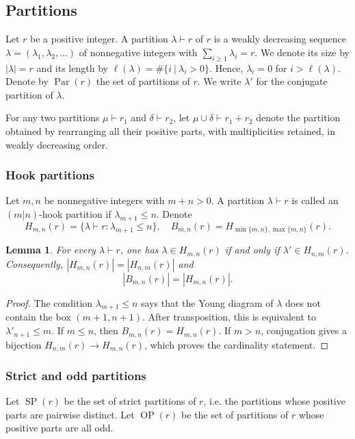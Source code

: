 \documentclass[11pt]{amsart}
\numberwithin{equation}{section}
\theoremstyle{plain}
\newtheorem{lem}[thm]{Lemma}
\theoremstyle{definition}
\theoremstyle{remark}
\begin{document}
\subsection{Partitions}
Let $r$ be a positive integer. A partition $\lambda\vdash r$ of $r$ is a weakly decreasing sequence
$\lambda=(\lambda_1,\lambda_2,\ldots)$ of nonnegative integers with
$\sum_{i\geq1}\lambda_i=r$.
We denote its size by $|\lambda|=r$ and its length by
$\ell(\lambda)=\#\{i~|~\lambda_i>0\}$. Hence, $\lambda_i=0$ for $i>\ell(\lambda)$. Denote by $\operatorname{Par}(r)$ the set of partitions of $r$. We write
$\lambda'$ for the conjugate partition of $\lambda$. 

For any two partitions $\mu\vdash r_1$ and $\delta\vdash r_2$, let $\mu\cup\delta\vdash r_1+r_2$
denote the partition obtained by rearranging all their positive
parts, with multiplicities retained, in weakly decreasing order.

\subsubsection{Hook partitions}
Let $m,n$ be nonnegative integers with $m+n>0$. A partition $\lambda\vdash r$ is called an $(m|n)$-hook partition if
$\lambda_{m+1}\leq n$. Denote
$$
H_{m,n}(r)=\{\lambda\vdash r:\lambda_{m+1}\leq n\},
\quad
B_{m,n}(r)=H_{\min\{m,n\},\max\{m,n\}}(r).
$$

\begin{lem}
For every $\lambda\vdash r$, one has
$\lambda\in H_{m,n}(r)$ if and only if
$\lambda'\in H_{n,m}(r)$. Consequently,
$|H_{m,n}(r)|=|H_{n,m}(r)|$ and
\begin{equation}\label{eq:BH-card}
|B_{m,n}(r)|=|H_{m,n}(r)|.
\end{equation}
\end{lem}

\begin{proof}
The condition $\lambda_{m+1}\leq n$ says that the Young diagram of
$\lambda$ does not contain the box $(m+1,n+1)$. After transposition,
this is equivalent to $\lambda'_{n+1}\leq m$. If $m\leq n$, then
$B_{m,n}(r)=H_{m,n}(r)$. If $m>n$, conjugation gives a bijection
$H_{n,m}(r)\to H_{m,n}(r)$, which proves the cardinality statement.
\end{proof}


\subsubsection{Strict and odd partitions}
Let $\operatorname{SP}(r)$ be the set of strict partitions of $r$, i.e. the partitions whose positive parts are pairwise distinct.
Let $\operatorname{OP}(r)$ be the set of partitions of $r$ whose positive parts are all odd. 
% 
\end{document}
